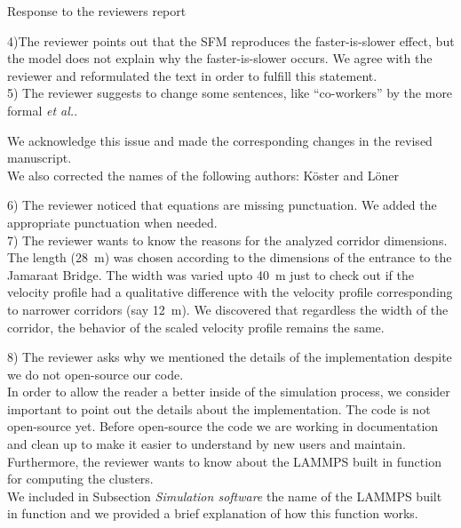 \documentclass[a4paper,12pt]{letter}
\begin{document}
\begin{letter}{Response to the reviewers report}
{%

4)The reviewer points out that the SFM reproduces the faster-is-slower effect, but the model
does not explain why the faster-is-slower occurs. We agree with the reviewer and reformulated 
the text in order to fulfill this statement.\\

5) The reviewer suggests to change some sentences, like ``co-workers'' by 
the more formal \textit{et al.}. 

We acknowledge this issue and made the corresponding changes in the
revised manuscript. \\

We also corrected the names of the following authors: K\"oster and L\"oner  

6) The reviewer noticed that equations are missing punctuation. We added the appropriate punctuation when needed. \\

7) The reviewer wants to know the reasons for the analyzed corridor dimensions. 
\\

The length (28~m) was chosen according to the dimensions of the entrance to the Jamaraat Bridge. 
The width was varied upto 40~m just to check out if the velocity profile had a qualitative difference with the velocity profile corresponding to narrower corridors (say 12~m). We discovered that regardless the width of the corridor, the behavior of the scaled velocity profile remains the same. 

8) The reviewer asks why we mentioned the details of the implementation despite 
we do not open-source our code. \\

In order to allow the reader a better inside of the simulation process, we 
consider important to point out the details about the implementation. The code is not open-source yet.
Before open-source the code we are working in documentation and clean up to make it easier to understand by new users and maintain.  \\

Furthermore, the reviewer wants to know about the LAMMPS built in function for 
computing the clusters. \\

We included in Subsection \textit{Simulation software} the name of the LAMMPS 
built in function and we provided a brief explanation of how this function works. \\ 

}
\end{letter}
\end{document}
